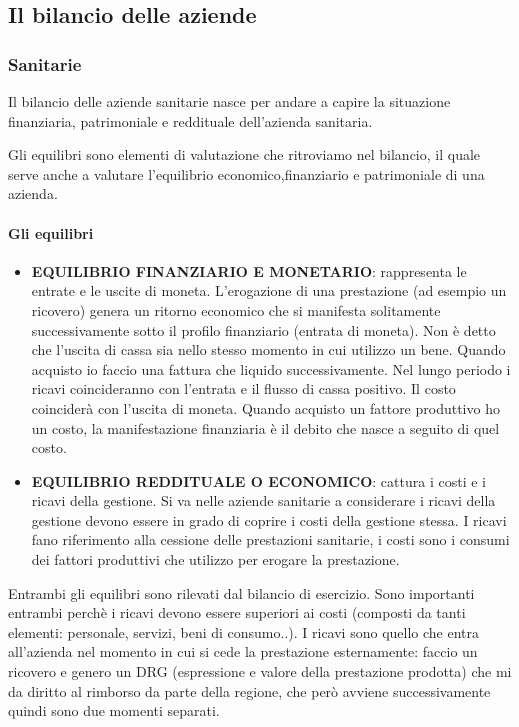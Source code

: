 \subsection{Il bilancio delle aziende}

\subsubsection{Sanitarie}

Il bilancio delle aziende sanitarie nasce per andare a capire la
situazione finanziaria, patrimoniale e reddituale dell'azienda
sanitaria.

Gli equilibri sono elementi di valutazione che ritroviamo nel bilancio,
il quale serve anche a valutare l'equilibrio economico,finanziario e
patrimoniale di una azienda.

\paragraph{Gli equilibri}

\begin{itemize}
\item
  \textbf{EQUILIBRIO FINANZIARIO E MONETARIO}: rappresenta le entrate e
  le uscite di moneta. L'erogazione di una prestazione (ad esempio un
  ricovero) genera un ritorno economico che si manifesta solitamente
  successivamente sotto il profilo finanziario (entrata di moneta). Non
  è detto che l'uscita di cassa sia nello stesso momento in cui utilizzo
  un bene. Quando acquisto io faccio una fattura che liquido
  successivamente. Nel lungo periodo i ricavi coincideranno con
  l'entrata e il flusso di cassa positivo. Il costo coinciderà con
  l'uscita di moneta. Quando acquisto un fattore produttivo ho un costo,
  la manifestazione finanziaria è il debito che nasce a seguito di quel
  costo.
\item
  \textbf{EQUILIBRIO REDDITUALE O ECONOMICO}: cattura i costi e i ricavi
  della gestione. Si va nelle aziende sanitarie a considerare i ricavi
  della gestione devono essere in grado di coprire i costi della
  gestione stessa. I ricavi fano riferimento alla cessione delle
  prestazioni sanitarie, i costi sono i consumi dei fattori produttivi
  che utilizzo per erogare la prestazione.
\end{itemize}

Entrambi gli equilibri sono rilevati dal bilancio di esercizio. Sono
importanti entrambi perchè i ricavi devono essere superiori ai costi
(composti da tanti elementi: personale, servizi, beni di consumo..). I
ricavi sono quello che entra all'azienda nel momento in cui si cede la
prestazione esternamente: faccio un ricovero e genero un DRG
(espressione e valore della prestazione prodotta) che mi da diritto al
rimborso da parte della regione, che però avviene successivamente quindi
sono due momenti separati.

